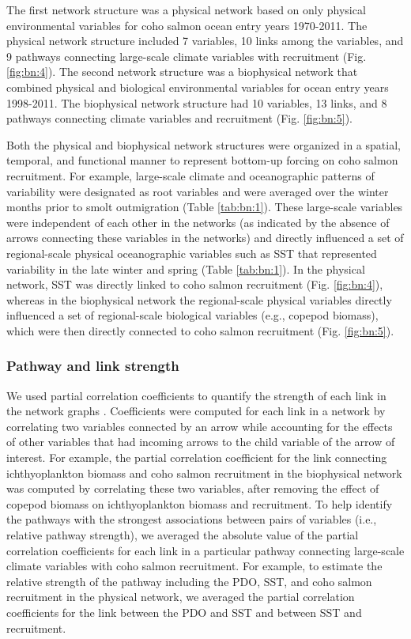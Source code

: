 The first network structure was a physical network based on only physical
environmental variables for coho salmon ocean entry years 1970-2011. The
physical network structure included 7 variables, 10 links among the variables,
and 9 pathways connecting large-scale climate variables with recruitment (Fig.
\ref{fig:bn:4}). The second network structure was a biophysical network that
combined physical and biological environmental variables for ocean entry years
1998-2011. The biophysical network structure had 10 variables, 13 links, and 8
pathways connecting climate variables and recruitment (Fig. \ref{fig:bn:5}).

Both the physical and biophysical network structures were organized in a
spatial, temporal, and functional manner to represent bottom-up forcing on coho
salmon recruitment. For example, large-scale climate and oceanographic patterns
of variability were designated as root variables and were averaged over the
winter months prior to smolt outmigration (Table \ref{tab:bn:1}). These
large-scale variables were independent of each other in the networks (as
indicated by the absence of arrows connecting these variables in the networks)
and directly influenced a set of regional-scale physical oceanographic variables
such as SST that represented variability in the late winter and spring (Table
\ref{tab:bn:1}). In the physical network, SST was directly linked to coho salmon
recruitment (Fig. \ref{fig:bn:4}), whereas in the biophysical network the
regional-scale physical variables directly influenced a set of regional-scale
biological variables (e.g., copepod biomass), which were then directly connected
to coho salmon recruitment (Fig. \ref{fig:bn:5}).


\subsubsection{Pathway and link strength}

We used partial correlation coefficients to quantify the strength of each link
in the network graphs \citep{Zar1999a, Scutari2010, Yang2011}.  Coefficients
were computed for each link in a network by correlating two variables connected
by an arrow while accounting for the effects of other variables that had
incoming arrows to the child variable of the arrow of interest. For example, the
partial correlation coefficient for the link connecting ichthyoplankton biomass
and coho salmon recruitment in the biophysical network was computed by
correlating these two variables, after removing the effect of copepod biomass on
ichthyoplankton biomass and recruitment. To help identify the pathways with the
strongest associations between pairs of variables (i.e., relative pathway
strength), we averaged the absolute value of the partial correlation
coefficients for each link in a particular pathway connecting large-scale
climate variables with coho salmon recruitment.  For example, to estimate the
relative strength of the pathway including the PDO, SST, and coho salmon
recruitment in the physical network, we averaged the partial correlation
coefficients for the link between the PDO and SST and between SST and
recruitment.


